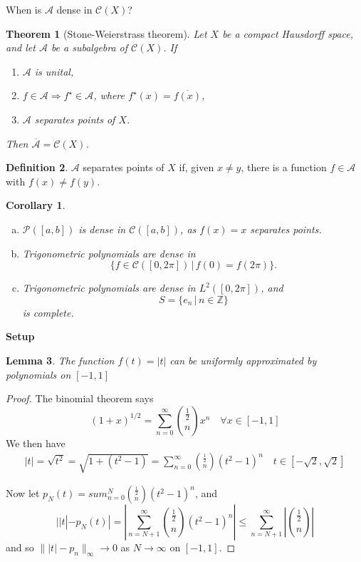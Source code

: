 \documentclass[justified]{tufte-book}
\theoremstyle{plain}%
\newtheorem{thm}{Theorem}[chapter]
\newtheorem{lem}[thm]{Lemma}
\newtheorem*{cor}{Corollary}
\theoremstyle{definition}
\newtheorem{defn}[thm]{Definition}
\theoremstyle{remark}
\newcommand{\given}{ \, | \,}
\newcommand{\Z}{\mathbb{Z}}
\begin{document}
When is $\mathcal{A}$ dense in $\mathcal{C}(X)$?

\begin{thm}[Stone-Weierstrass theorem]
  Let $X$ be a compact Hausdorff space, and let $\mathcal{A}$ be a subalgebra of $\mathcal{C}(X)$. If 
  \begin{enumerate}[(1)]
      \item $\mathcal{A}$ is unital,
      \item $f \in \mathcal{A} \Rightarrow f^\star \in \mathcal{A}$, where $f^\star(x) = \overline{f(x)}$,
      \item $\mathcal{A}$ separates points of $X$.
  \end{enumerate}
  Then $\overline{\mathcal{A}} = \mathcal{C}(X)$. 
\end{thm}

\begin{defn}
  $\mathcal{A}$ separates points of $X$ if, given $x \neq y$, there is a function $f \in \mathcal{A}$ with $f(x) \neq f(y)$.  
\end{defn}
\begin{cor}
  \begin{enumerate}[(a)]
      \item $\mathcal{P}([a,b])$ is dense in $\mathcal{C}([a,b])$, as $f(x) = x$ separates points.  
      \item Trigonometric polynomials are dense in \[
          \{ f \in \mathcal{C}([0,2 \pi]) \, | \, f(0) = f(2 \pi) \}. 
      \]
      \item Trigonometric polynomials are dense in $L^2([0,2\pi])$, and \[
          S = \{ e_n \given n \in \Z \} 
      \] is complete.
  \end{enumerate}
\end{cor}

\textbf{Setup}
\begin{lem}
  The function $f(t) = |t|$ can be uniformly approximated by polynomials on $[-1,1]$  
\end{lem}
\begin{proof}
  The binomial theorem says \[
      (1 + x)^{1/2} = \sum_{n=0}^\infty {\frac{1}{2} \choose n} x^n \quad \forall x \in [-1,1]
  \]  We then have 
\begin{align*}
  |t | = \sqrt{t^2} = \sqrt{1 + (t^2 -1)} = \sum_{n=0}^\infty {\frac{1}{2} \choose n } (t^2 - 1)^n \quad t \in [-\sqrt{2}, \sqrt{2}]
\end{align*}

Now let $p_N(t) = sum_{n=0}^N {\frac{1}{2} \choose n } (t^2 - 1)^n$, and \[
  | |t| -p_N(t) | = | \sum_{n = N+1}^\infty { \frac{1}{2} \choose n}(t^2 - 1)^n | \leq \sum_{n = N+1}^\infty | {\frac{1}{2} \choose n} |
\] and so $\| |t| - p_n \|_\infty \rightarrow 0$ as $N \rightarrow \infty$ on $[-1,1]$.
\end{proof}
\end{document}
